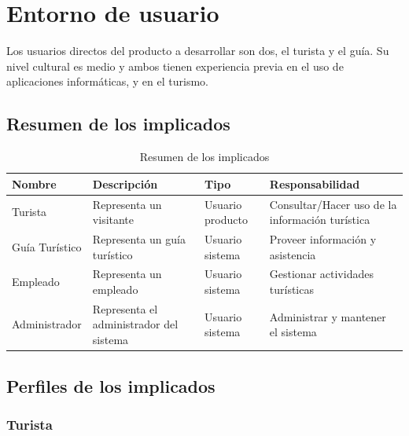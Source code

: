 

\chapter{Entorno de usuario}

Los usuarios directos del producto a desarrollar son dos, el turista y el guía. Su nivel cultural es medio y ambos tienen experiencia previa en el uso de aplicaciones informáticas, y en el turismo.

\section*{Resumen de los implicados}

\begin{table}[H]
\centering
\begin{tabular}{|p{3cm}|p{3cm}|p{4cm}|p{4cm}|}
\hline
\rowcolor[HTML]{CFE2F3} 
\textbf{Nombre} & \textbf{Descripción} & \textbf{Tipo} & \textbf{Responsabilidad} \\ \hline
Turista & Representa un visitante & Usuario producto & Consultar/Hacer uso de la información turística\\ \hline
Guía Turístico & Representa un guía turístico & Usuario sistema & Proveer información y asistencia \\ \hline
Empleado & Representa un empleado & Usuario sistema & Gestionar actividades turísticas \\ \hline
Administrador & Representa el administrador del sistema & Usuario sistema & Administrar y mantener el sistema \\ \hline
\end{tabular}
\caption{Resumen de los implicados}
\label{tab:resumen_implicados}
\end{table}

\section*{Perfiles de los implicados}

\subsection*{Turista}

